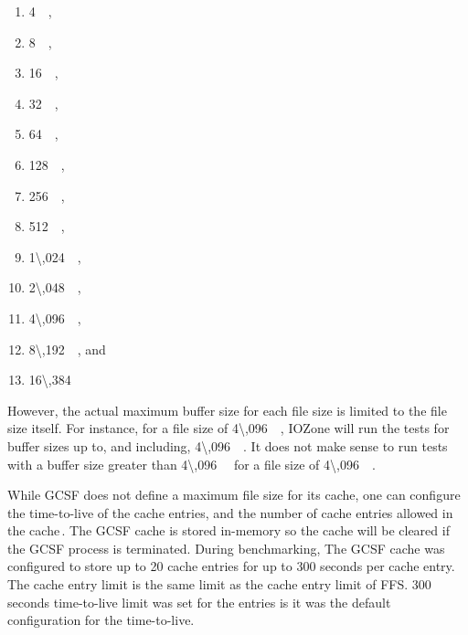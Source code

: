 \begin{enumerate}
	\item \SI{4}{\kilo\byte},
	\item \SI{8}{\kilo\byte},
	\item \SI{16}{\kilo\byte},
	\item \SI{32}{\kilo\byte},
	\item \SI{64}{\kilo\byte},
	\item \SI{128}{\kilo\byte},
	\item \SI{256}{\kilo\byte},
	\item \SI{512}{\kilo\byte},
	\item \SI{1\,024}{\kilo\byte},
	\item \SI{2\,048}{\kilo\byte},
	\item \SI{4\,096}{\kilo\byte},
	\item \SI{8\,192}{\kilo\byte}, and
	\item \SI{16\,384}{\kilo\byte}
\end{enumerate}
However, the actual maximum buffer size for each file size is limited to the file size itself. For instance, for a file size of \SI{4\,096}{\kilo\byte}, IOZone will run the tests for buffer sizes up to, and including, \SI{4\,096}{\kilo\byte}. It does not make sense to run tests with a buffer size greater than \SI{4\,096}{\kilo\byte} for a file size of \SI{4\,096}{\kilo\byte}.

While \gls{GCSF} does not define a maximum file size for its cache, one can configure the \mbox{time-to-live} of the cache entries, and the number of cache entries allowed in the cache\,\cite{sergiudanGcsfConfigRust}. The \gls{GCSF} cache is stored \mbox{in-memory} so the cache will be cleared if the \gls{GCSF} process is terminated. During benchmarking, The \gls{GCSF} cache was configured to store up to 20 cache entries for up to 300 seconds per cache entry. The cache entry limit is the same limit as the cache entry limit of \gls{FFS}. 300 seconds \mbox{time-to-live} limit was set for the entries is it was the default configuration for the \mbox{time-to-live}.

